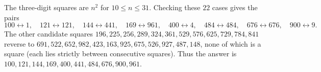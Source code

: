 The three-digit squares are $n^2$ for $10\le n\le31$. Checking these $22$ cases gives the pairs\[100\leftrightarrow1,\quad121\leftrightarrow121,\quad144\leftrightarrow441,\quad169\leftrightarrow961,\quad400\leftrightarrow4,\quad484\leftrightarrow484,\quad676\leftrightarrow676,\quad900\leftrightarrow9.\]The other candidate squares $196,225,256,289,324,361,529,576,625,729,784,841$ reverse to $691,522,652,982,423,163,925,675,526,927,487,148$, none of which is a square (each lies strictly between consecutive squares). Thus the answer is $\boxed{100,121,144,169,400,441,484,676,900,961}$.
